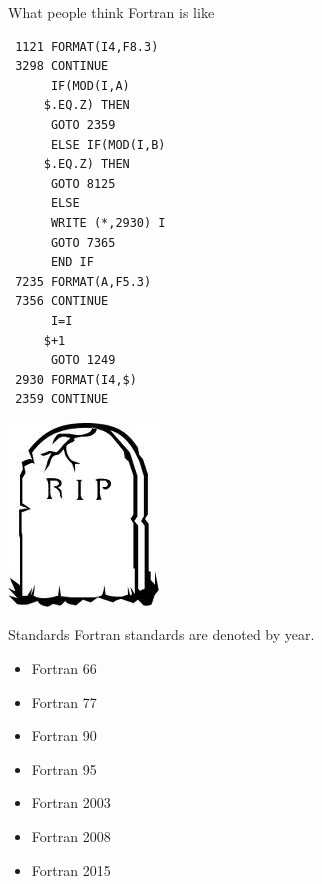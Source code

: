 \begin{frame}[fragile]
\begin{block}{What people think Fortran is like}
\begin{minipage}{.475\textwidth}
\begin{lstlisting}
 1121 FORMAT(I4,F8.3)
 3298 CONTINUE
      IF(MOD(I,A)
     $.EQ.Z) THEN
      GOTO 2359
      ELSE IF(MOD(I,B)
     $.EQ.Z) THEN
      GOTO 8125
      ELSE
      WRITE (*,2930) I
      GOTO 7365
      END IF
 7235 FORMAT(A,F5.3)
 7356 CONTINUE
      I=I
     $+1
      GOTO 1249
 2930 FORMAT(I4,$)
 2359 CONTINUE
\end{lstlisting}
\end{minipage}
\begin{minipage}{.475\textwidth}
  \begin{center}
    \includegraphics{pics/tombstone}
  \end{center}
\end{minipage}
\end{block}
\end{frame}


\begin{frame}
  \begin{block}{Standards}\pause
  Fortran standards are denoted by year.
  \begin{itemize}
    \item Fortran 66
    \item Fortran 77
    \item Fortran 90
    \item Fortran 95
    \item Fortran 2003
    \item Fortran 2008
    \item Fortran 2015
  \end{itemize}
  \end{block}
\end{frame}


